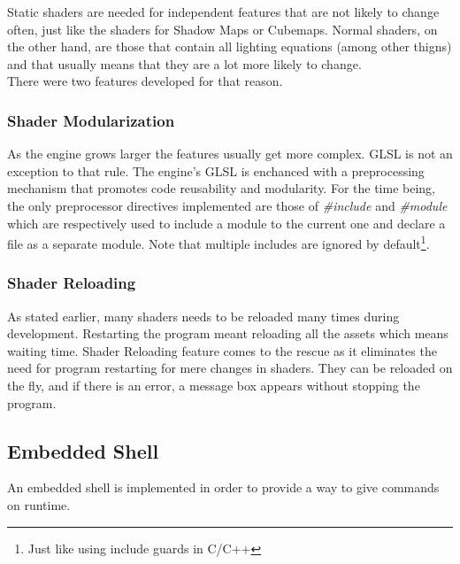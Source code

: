 \noindent Static shaders are needed for independent features that are not likely to change often,
just like the shaders for Shadow Maps or Cubemaps. Normal shaders, on the other hand, are those
that contain all lighting equations (among other thigns) and that usually means that they are a
lot more likely to change.\\
There were two features developed for that reason.

\subsubsection{Shader Modularization}
As the engine grows larger the features usually get more complex. GLSL is not an exception to that
rule. The engine's GLSL is enchanced with a preprocessing mechanism that promotes code reusability
and modularity. For the time being, the only preprocessor directives implemented are those of
\textit{\#include} and \textit{\#module} which are respectively used to include a module to the
current one and declare a file as a separate module. Note that multiple includes are ignored by
default\footnote{Just like using include guards in C/C++}.

\subsubsection{Shader Reloading}
As stated earlier, many shaders needs to be reloaded many times during development. Restarting
the program meant reloading all the assets which means waiting time. Shader Reloading feature
comes to the rescue as it eliminates the need for program restarting for mere changes in shaders.
They can be reloaded on the fly, and if there is an error, a message box appears without stopping
the program.

\subsection{Embedded Shell}
An embedded shell is implemented in order to provide a way to give commands on runtime.
